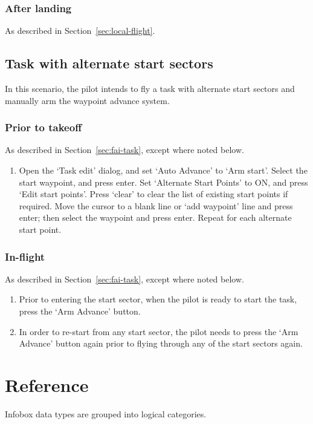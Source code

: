 \documentclass[a4paper,12pt]{refrep}
\begin{document}
\subsection*{After landing}
As described in Section~\ref{sec:local-flight}.

\section{Task with alternate start sectors}

In this scenario, the pilot intends to fly a task with 
alternate start sectors and manually arm the waypoint advance system.

\subsection*{Prior to takeoff}
As described in Section~\ref{sec:fai-task}, except where noted below.
\begin{enumerate}
\item Open the `Task edit' dialog, and set `Auto Advance' to `Arm start'.
  Select the start waypoint, and press enter.  Set `Alternate Start
  Points' to ON, and press `Edit start points'.  Press `clear' to
  clear the list of existing start points if required.  Move the
  cursor to a blank line or `add waypoint' line and press enter; then
  select the waypoint and press enter.  Repeat for each alternate
  start point.
\end{enumerate}

\subsection*{In-flight}
As described in Section~\ref{sec:fai-task}, except where noted below.
\begin{enumerate}
\item 
Prior to entering the start sector, when the pilot is ready to start
the task, press the `Arm Advance' button.

\item 
In order to re-start from any start sector, the pilot needs to press
the `Arm Advance' button again prior to flying through any of the
start sectors again.
\end{enumerate}



\chapter{{\InfoBox} Reference}\label{cha:infobox}
Infobox data types are grouped into logical categories.
\end{document}

